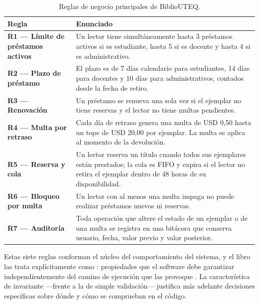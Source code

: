 \begin{table}[htbp]
    \centering
    \caption{Reglas de negocio principales de BiblioUTEQ.}
    \label{tab:u0:reglas}
    \renewcommand{\arraystretch}{1.25}
    \begin{tabular}{>{\bfseries}p{3.2cm} p{10.6cm}}
        \toprule
        \rowcolor{uteqverde!12}
        \textnormal{\textbf{Regla}} & \textbf{Enunciado} \\
        \midrule
        R1 --- L\'imite de pr\'estamos activos & Un lector tiene simult\'aneamente hasta 3 pr\'estamos activos si es estudiante, hasta 5 si es docente y hasta 4 si es administrativo. \\
        R2 --- Plazo de pr\'estamo & El plazo es de 7 d\'ias calendario para estudiantes, 14 d\'ias para docentes y 10 d\'ias para administrativos, contados desde la fecha de retiro. \\
        R3 --- Renovaci\'on & Un pr\'estamo se renueva una sola vez si el ejemplar no tiene reservas y el lector no tiene multas pendientes. \\
        R4 --- Multa por retraso & Cada d\'ia de retraso genera una multa de USD 0,50 hasta un tope de USD 20,00 por ejemplar. La multa se aplica al momento de la devoluci\'on. \\
        R5 --- Reserva y cola & Un lector reserva un t\'itulo cuando todos sus ejemplares est\'an prestados; la cola es FIFO y expira si el lector no retira el ejemplar dentro de 48 horas de su disponibilidad. \\
        R6 --- Bloqueo por multa & Un lector con al menos una multa impaga no puede realizar pr\'estamos nuevos ni reservas. \\
        R7 --- Auditor\'ia & Toda operaci\'on que altere el estado de un ejemplar o de una multa se registra en una bit\'acora que conserva usuario, fecha, valor previo y valor posterior. \\
        \bottomrule
    \end{tabular}
\end{table}

Estas siete reglas conforman el n\'ucleo del comportamiento del sistema, y el libro las trata expl\'icitamente como : propiedades que el software debe garantizar independientemente del camino de ejecuci\'on que las provoque \cite{evans2003ddd}. La caracter\'istica de invariante ---frente a la de simple validaci\'on--- justifica m\'as adelante decisiones espec\'ificas sobre d\'onde y c\'omo se comprueban en el c\'odigo.

